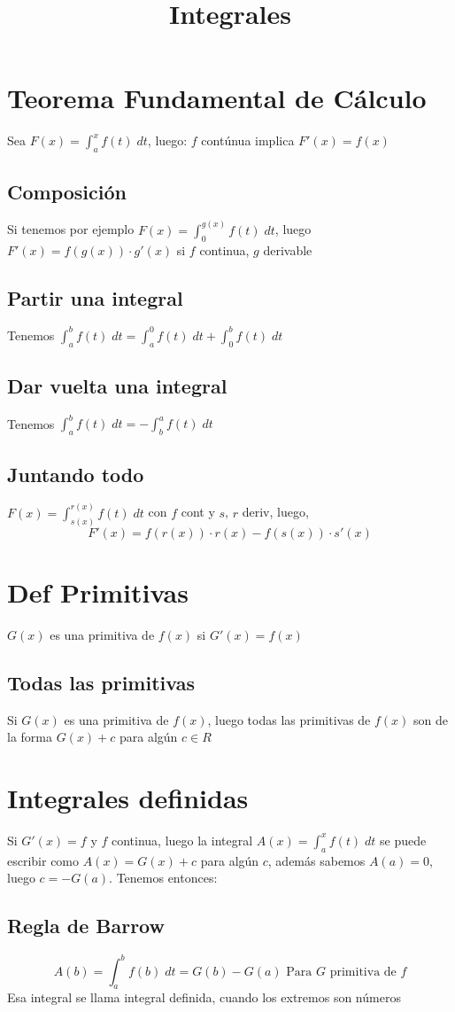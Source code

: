 \documentclass{article}
\title{Integrales}
\date{}
\author{}
\begin{document}
\maketitle
\section{Teorema Fundamental de Cálculo}
Sea \(
F(x) = \int_a^xf(t) \; dt
\), luego: \(
	f
\) contúnua implica \(
F'(x) = f(x)
\)
\subsection{Composición}
Si tenemos por ejemplo \(
F(x) = \int_0^{g(x)}f(t) \; dt
\), luego \(
F'(x) = f(g(x)) \cdot g'(x)
\) si $f$ continua, $g$ derivable
\subsection{Partir una integral}
Tenemos \(
\int_a^b f(t)\;dt = \int_a^0 f(t)\;dt + \int_0^b f(t)\;dt
\)
\subsection{Dar vuelta una integral}
Tenemos \(
\int_a^b f(t) \; dt = -\int_b^a f(t) \; dt
\)
\subsection{Juntando todo}
\(
F(x) = \int_{s(x)}^{r(x)} f(t) \; dt
\) con $f$ cont y $s$, $r$ deriv, luego,
\[
F'(x) = f(r(x)) \cdot r(x) - f(s(x)) \cdot s'(x)
\]
\section{Def Primitivas}
$G(x)$ es una primitiva de $f(x)$ si $G'(x) = f(x)$
\subsection{Todas las primitivas}
Si $G(x)$ es una primitiva de $f(x)$, luego todas las primitivas de $f(x)$
son de la forma $G(x) + c$ para algún $c\in R$
\section{Integrales definidas}
Si $G'(x) = f$ y $f$ continua, luego la integral
\(
A(x) = \int_a^xf(t) \; dt
\) se puede escribir como $A(x) = G(x) + c$ para algún $c$, además sabemos
$A(a) = 0$, luego $c = -G(a)$. Tenemos entonces:
\subsection{Regla de Barrow}
\[
	A(b) = \int_a^b f(b) \; dt = G(b) - G(a) \text{ Para $G$ primitiva de $f$}
\]
Esa integral se llama integral definida, cuando los extremos son números
\end{document}
